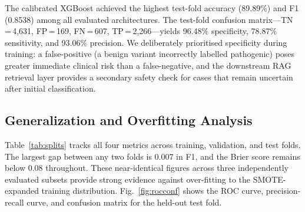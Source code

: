 \documentclass[conference]{IEEEtran}
\begin{document}
The calibrated XGBoost achieved the highest test-fold accuracy
(89.89\%) and F1 (0.8538) among all evaluated architectures.
The test-fold confusion matrix---TN\,=\,4,631,
FP\,=\,169, FN\,=\,607, TP\,=\,2,266---yields 96.48\% specificity,
78.87\% sensitivity, and 93.06\% precision. We deliberately
prioritised specificity during training: a false-positive (a benign
variant incorrectly labelled pathogenic) poses greater immediate
clinical risk than a false-negative, and the downstream RAG
retrieval layer provides a secondary safety check for cases that
remain uncertain after initial classification.

\begin{table}[!htb]
\caption{Model Comparison --- Held-Out Evaluation Metrics.
  Rows 1--4 report validation-fold results; neural networks and the
  deployed model are evaluated on the held-out test fold.}
\label{tab:results}
\begin{center}
\end{center}
\end{table}

\subsection{Generalization and Overfitting Analysis}

Table~\ref{tab:splits} tracks all four metrics across training,
validation, and test folds. The largest gap between any two folds
is 0.007 in F1, and the Brier score remains below 0.08 throughout.
These near-identical figures across three independently evaluated
subsets provide strong evidence against over-fitting to the
SMOTE-expanded training distribution.
Fig.~\ref{fig:rocconf} shows the ROC curve, precision-recall
curve, and confusion matrix for the held-out test fold.
\end{document}
